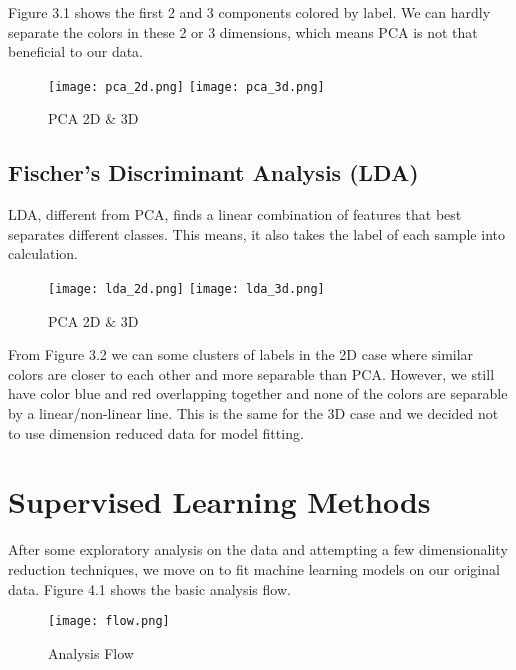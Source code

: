 \documentclass[11pt]{article}
\begin{document}
\noindent Figure 3.1 shows the first 2 and 3 components colored by label. We can hardly separate the colors in these 2 or 3 dimensions, which means PCA is not that beneficial to our data.

\begin{figure}[h]
\label{pca}
\begin{center}
\texttt{[image: pca\_2d.png]}
\texttt{[image: pca\_3d.png]}
\end{center}
\caption{PCA 2D $\&$ 3D}
\end{figure}

\subsection{Fischer's Discriminant Analysis (LDA)}
LDA, different from PCA, finds a linear combination of features that best separates different classes. This means, it also takes the label of each sample into calculation.

\begin{figure}[h]
\label{lda}
\begin{center}
\texttt{[image: lda\_2d.png]}
\texttt{[image: lda\_3d.png]}
\end{center}
\caption{PCA 2D $\&$ 3D}
\end{figure}

\noindent From Figure 3.2 we can some clusters of labels in the 2D case where similar colors are closer to each other and more separable than PCA. However, we still have color blue and red overlapping together and none of the colors are separable by a linear/non-linear line. This is the same for the 3D case and we decided not to use dimension reduced data for model fitting.

\newpage 

\section{Supervised Learning Methods}
After some exploratory analysis on the data and attempting a few dimensionality reduction techniques, we move on to fit machine learning models on our original data. Figure 4.1 shows the basic analysis flow. 

\begin{figure}[h]
\label{flow}
\begin{center}
\texttt{[image: flow.png]}
\end{center}
\caption{Analysis Flow}
\end{figure}
\end{document}
